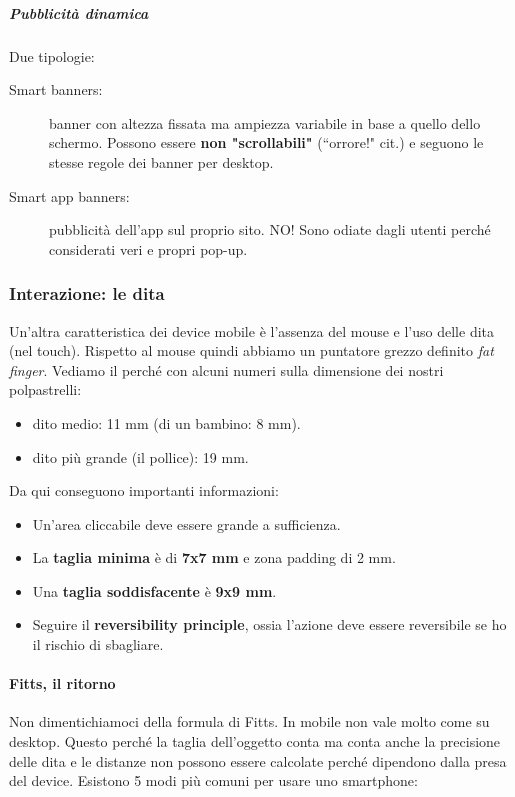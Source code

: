 				\subparagraph{Pubblicità dinamica}
					Due tipologie:
					\begin{description}
						\item[Smart banners:] banner con altezza fissata ma ampiezza variabile in base a quello dello schermo. Possono essere \textbf{non "scrollabili"} (``orrore!" cit.) e seguono le stesse regole dei banner per desktop.
						\item[Smart app banners:] pubblicità dell'app sul proprio sito. NO! Sono odiate dagli utenti perché considerati veri e propri pop-up.
					\end{description}
					
		\subsubsection{Interazione: le dita}
			Un'altra caratteristica dei device mobile è l'assenza del mouse e l'uso delle dita (nel touch). Rispetto al mouse quindi abbiamo un puntatore grezzo definito \emph{fat finger}. Vediamo il perché con alcuni numeri sulla dimensione dei nostri polpastrelli:
			\begin{itemize}
				\item dito medio: 11 mm (di un bambino: 8 mm).
				\item dito più grande (il pollice): 19 mm.
			\end{itemize}
			Da qui conseguono importanti informazioni:
			\begin{itemize}
				\item Un'area cliccabile deve essere grande a sufficienza.
				\item La \textbf{taglia minima} è di \textbf{7x7 mm} e zona padding di 2 mm.
				\item Una \textbf{taglia soddisfacente} è \textbf{9x9 mm}. 
				\item Seguire il \textbf{reversibility principle}, ossia l'azione deve essere reversibile se ho il rischio di sbagliare.
			\end{itemize}
				
				\paragraph{Fitts, il ritorno}
					Non dimentichiamoci della formula di Fitts. In mobile non vale molto come su desktop. Questo perché la taglia dell'oggetto conta ma conta anche la precisione delle dita e le distanze non possono essere calcolate perché dipendono dalla presa del device. Esistono 5 modi più comuni per usare uno smartphone:
					

